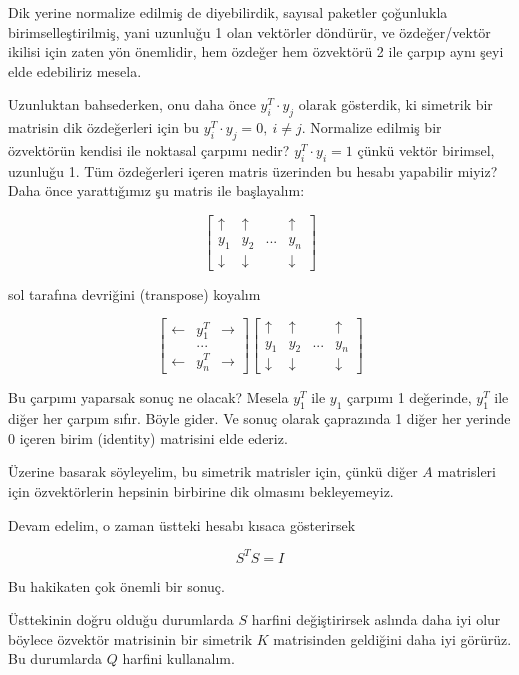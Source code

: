 \documentclass[12pt,fleqn]{article}\usepackage{../../common}
\begin{document}
Dik yerine normalize edilmiş de diyebilirdik, sayısal paketler çoğunlukla
birimselleştirilmiş, yani uzunluğu 1 olan vektörler döndürür, ve
özdeğer/vektör ikilisi için zaten yön önemlidir, hem özdeğer hem özvektörü
2 ile çarpıp aynı şeyi elde edebiliriz mesela.

Uzunluktan bahsederken, onu daha önce $y_i^T \cdot y_j$ olarak gösterdik,
ki simetrik bir matrisin dik özdeğerleri için bu $y_i^T \cdot y_j = 0, \ i
\ne j$. Normalize edilmiş bir özvektörün kendisi ile noktasal çarpımı nedir? 
$y_i^T \cdot y_i = 1$ çünkü vektör birimsel, uzunluğu 1. Tüm
özdeğerleri içeren matris üzerinden bu hesabı yapabilir miyiz? Daha önce
yarattığımız şu matris ile başlayalım:

$$ 
\left[\begin{array}{cccc}
\uparrow & \uparrow &  & \uparrow \\
y_1 & y_2 & ... & y_n \\
\downarrow & \downarrow &  & \downarrow 
\end{array}\right]
$$

sol tarafına devriğini (transpose) koyalım

$$ 
\left[\begin{array}{ccc}
\leftarrow & y_1^T & \rightarrow \\
 & ... & \\
\leftarrow & y_n^T & \rightarrow 
\end{array}\right]
\left[\begin{array}{cccc}
\uparrow & \uparrow &  & \uparrow \\
y_1 & y_2 & ... & y_n \\
\downarrow & \downarrow &  & \downarrow 
\end{array}\right]
$$

Bu çarpımı yaparsak sonuç ne olacak? Mesela $y_1^T$ ile $y_1$ çarpımı 1
değerinde, $y_1^T$ ile diğer her çarpım sıfır. Böyle gider. Ve sonuç olarak
çaprazında 1 diğer her yerinde 0 içeren birim (identity) matrisini elde
ederiz.

Üzerine basarak söyleyelim, bu simetrik matrisler için, çünkü diğer $A$
matrisleri için özvektörlerin hepsinin birbirine dik olmasını
bekleyemeyiz. 

Devam edelim, o zaman üstteki hesabı kısaca gösterirsek

$$ S^T S = I $$

Bu hakikaten çok önemli bir sonuç. 

Üsttekinin doğru olduğu durumlarda $S$ harfini değiştirirsek aslında daha iyi
olur böylece özvektör matrisinin bir simetrik $K$ matrisinden geldiğini
daha iyi görürüz. Bu durumlarda $Q$ harfini kullanalım. 
\end{document}
